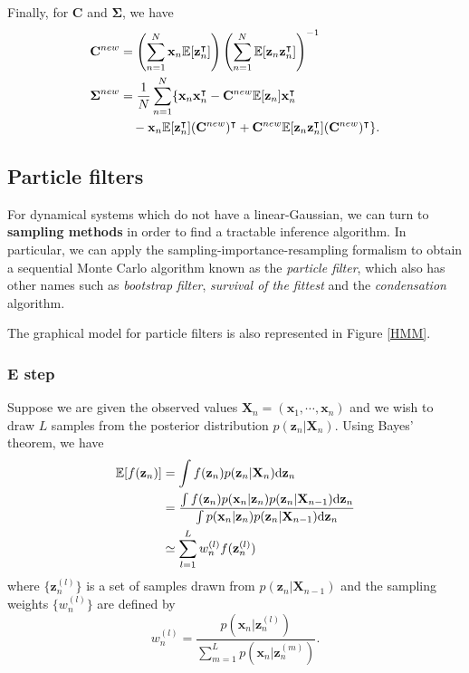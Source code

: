 \documentclass[a4paper]{report}
\newcommand{\ud}{\mathrm{d}}
\renewcommand{\bf}{\mathbf}
\newcommand{\bb}{\mathbb}
\newcommand{\imp}[1]{{\color{blue}\textit{#1}}}
\newcommand{\bs}{\boldsymbol}
\begin{document}
Finally, for $\bf{C}$ and $\bs{\Sigma}$, we have
\begin{align}
	\bf{C}^{new} &= \left( \sum_{n=1}^N \bf{x}_n \bb{E}[\bf{z}_n^{\intercal}] \right)\left( \sum_{n=1}^N \bb{E}[\bf{z}_n\bf{z}_n^{\intercal}] \right)^{-1} \\
	\bs{\Sigma}^{new} &= \frac{1}{N} \sum_{n=1}^N \{ \bf{x}_n\bf{x}_n^{\intercal} -\bf{C}^{new}\bb{E}[\bf{z}_n]\bf{x}_n^{\intercal} \notag \\
	&\quad - \bf{x}_n \bb{E}[\bf{z}_n^{\intercal}](\bf{C}^{new})^{\intercal} + \bf{C}^{new}\bb{E}[\bf{z}_n\bf{z}_n^{\intercal}](\bf{C}^{new})^{\intercal}\}.		 
\end{align}
\subsection{Particle filters}
For dynamical systems which do not have a linear-Gaussian, we can turn to \textbf{sampling methods} in order to find a tractable inference algorithm. In particular, we can apply the sampling-importance-resampling formalism to obtain a sequential Monte Carlo algorithm known as the \imp{particle filter}, which also has other names such as \imp{bootstrap filter}, \imp{survival of the fittest} and the \imp{condensation} algorithm.

The graphical model for particle filters is also represented in Figure \ref{HMM}. 

\subsubsection{E step}
Suppose we are given the observed values $\bf{X}_n = (\bf{x}_1,\cdots,\bf{x}_n)$ and we wish to draw $L$ samples from the posterior distribution $p(\bf{z}_n|\bf{X}_n)$. Using Bayes' theorem, we have
\begin{align}
	\bb{E}[f(\bf{z}_n)] &= \int f(\bf{z}_n)p(\bf{z}_n|\bf{X}_n) \ud \bf{z}_n \notag\\
	&= \frac{\int f(\bf{z}_n)p(\bf{x}_n|\bf{z}_n)p(\bf{z}_n|\bf{X}_{n-1})\ud \bf{z}_n}{\int p(\bf{x}_n|\bf{z}_n)p(\bf{z}_n|\bf{X}_{n-1})\ud \bf{z}_n} \notag\\
	&\simeq \sum_{l=1}^L w_n^{(l)} f(\bf{z}_n^{(l)}) \label{PF1}
\end{align}
where $\{ \bf{z}_n^{(l)}\}$ is a set of samples drawn from $p(\bf{z}_n|\bf{X}_{n-1})$ and the sampling weights $\{ w_n^{(l)} \}$ are defined by
\begin{equation}
	w_n^{(l)} = \frac{p(\bf{x}_n|\bf{z}_n^{(l)})}{\sum_{m=1}^L p(\bf{x}_n|\bf{z}_n^{(m)})}.
\end{equation}
\end{document}
